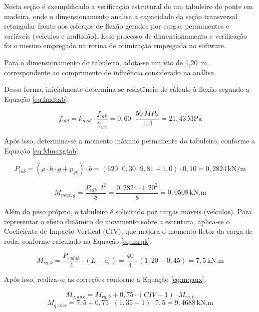 Nesta seção é exemplificado a verificação estrutural de um tabuleiro de ponte em madeira, onde o dimensionamento analisa a capacidade da seção transversal retangular frente aos esforços de flexão gerados por cargas permanentes e variáveis (veículos e multidão). Esse processo de dimensionamento e verificação foi o mesmo empregado na rotina de otimização empregada no software.

Para o dimensionamento do tabuleiro, adota-se um vão de 1{,}20~m, correspondente ao comprimento de influência considerado na análise.

Dessa forma, inicialmente determina-se resistência de cálculo à flexão segundo a Equação \eqref{eq:fmdtab}.

\begin{equation}
f_{md} = k_{mod} \cdot \frac{f_{mk}}{\gamma_{wc}} = 0,60 \cdot \frac{50\,MPa}{1,4} = 21,43\, \text{MPa}
\label{eq:fmdtab}
\end{equation}

Após isso, determina-se a momento máximo permanente do tabuleiro, conforme a Equação \eqref{eq:Mmaxgtab}.

\begin{equation}
P_{tab} = (\rho \cdot h \cdot g + p_{gk}) \cdot b = (620 \cdot 0,30 \cdot 9,81 + 1,0) \cdot 0,10 = 0,2824\, \text{kN/m}
\end{equation}

\begin{equation}
M_{max,g} = \frac{P_{tab} \cdot l^2}{8} = \frac{0,2824 \cdot 1,20^2}{8} = 0,0508\, \text{kN.m}
\label{eq:Mmaxgtab}
\end{equation}

Além do peso próprio, o tabuleiro é solicitado por cargas móveis (veículos). Para representar o efeito dinâmico do movimento sobre a estrutura, aplica-se o Coeficiente de Impacto Vertical (CIV), que majora o momento fletor da carga de roda, conforme calculado na Equação \eqref{eq:mrqk}.

\begin{equation}
M_{rq,k} = \frac{P_{rodak}}{4} \cdot (L - a_{r}) = \frac{40}{4} \cdot (1,20 - 0,45) = 7,5\, \text{kN.m}
\label{eq:mrqk}
\end{equation}

Após isso, realiza-se as correções conforme a Equação \eqref{eq:mqaux}.

\begin{equation}
M_{q,aux} = M_{rq,k} + 0,75 \cdot (CIV - 1) \cdot M_{rq,k}
\end{equation}
\begin{equation}
M_{q,aux} = 7,5 + 0,75 \cdot (1,35 - 1) \cdot 7,5 = 9,4688\,\text{kN.m}
\label{eq:mqaux}
\end{equation}

